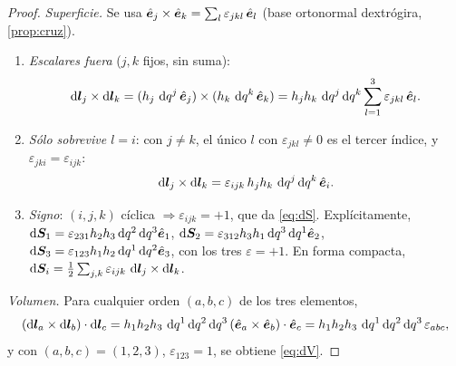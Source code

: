 \begin{proof}
\emph{Superficie.} Se usa $\hat{\bm{e}}_{j}\times\hat{\bm{e}}_{k}=\sum_{l}\varepsilon_{jkl}\,\hat{\bm{e}}_{l}$
(base ortonormal dextrógira, \cref{prop:cruz}).
\begin{enumerate}
  \item \emph{Escalares fuera} ($j,k$ fijos, sin suma):
  \[
    \mathop{}\!\mathrm{d}\bm{l}_{j}\times\mathop{}\!\mathrm{d}\bm{l}_{k}
    =(h_{j}\,\mathop{}\!\mathrm{d} q^{j}\,\hat{\bm{e}}_{j})\times(h_{k}\,\mathop{}\!\mathrm{d} q^{k}\,\hat{\bm{e}}_{k})
    =h_{j}h_{k}\,\mathop{}\!\mathrm{d} q^{j}\mathop{}\!\mathrm{d} q^{k}\sum_{l=1}^{3}\varepsilon_{jkl}\,\hat{\bm{e}}_{l}.
  \]
  \item \emph{Sólo sobrevive $l=i$}: con $j\neq k$, el único $l$ con
  $\varepsilon_{jkl}\neq0$ es el tercer índice, y $\varepsilon_{jki}=\varepsilon_{ijk}$:
  \[
    \mathop{}\!\mathrm{d}\bm{l}_{j}\times\mathop{}\!\mathrm{d}\bm{l}_{k}=\varepsilon_{ijk}\,h_{j}h_{k}\,\mathop{}\!\mathrm{d} q^{j}\mathop{}\!\mathrm{d} q^{k}\,\hat{\bm{e}}_{i}.
  \]
  \item \emph{Signo}: $(i,j,k)$ cíclica $\Rightarrow\varepsilon_{ijk}=+1$, que da
  \eqref{eq:dS}. Explícitamente,
  $\mathop{}\!\mathrm{d}\bm{S}_{1}=\varepsilon_{231}h_{2}h_{3}\mathop{}\!\mathrm{d} q^{2}\mathop{}\!\mathrm{d} q^{3}\hat{\bm{e}}_{1}$,
  $\mathop{}\!\mathrm{d}\bm{S}_{2}=\varepsilon_{312}h_{3}h_{1}\mathop{}\!\mathrm{d} q^{3}\mathop{}\!\mathrm{d} q^{1}\hat{\bm{e}}_{2}$,
  $\mathop{}\!\mathrm{d}\bm{S}_{3}=\varepsilon_{123}h_{1}h_{2}\mathop{}\!\mathrm{d} q^{1}\mathop{}\!\mathrm{d} q^{2}\hat{\bm{e}}_{3}$, con los
  tres $\varepsilon=+1$. En forma compacta,
  $\mathop{}\!\mathrm{d}\bm{S}_{i}=\tfrac12\sum_{j,k}\varepsilon_{ijk}\,\mathop{}\!\mathrm{d}\bm{l}_{j}\times\mathop{}\!\mathrm{d}\bm{l}_{k}$.
\end{enumerate}
\noindent\emph{Volumen.} Para cualquier orden $(a,b,c)$ de los tres elementos,
\[
  (\dd\vb{l}_{a}\times\dd\vb{l}_{b})\cdot\dd\vb{l}_{c}
  =h_{1}h_{2}h_{3}\,\dd q^{1}\dd q^{2}\dd q^{3}\,(\uv{e}_{a}\times\uv{e}_{b})\cdot\uv{e}_{c}
  =h_{1}h_{2}h_{3}\,\dd q^{1}\dd q^{2}\dd q^{3}\,\varepsilon_{abc},
\]
y con $(a,b,c)=(1,2,3)$, $\varepsilon_{123}=1$, se obtiene \eqref{eq:dV}.


\end{proof}

